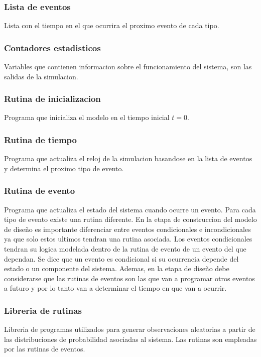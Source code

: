 \documentclass[a4paper]{article}
\begin{document}
\subsubsection*{Lista de eventos}
Lista con el tiempo en el que ocurrira el proximo evento de cada tipo.

\subsubsection*{Contadores estadisticos}
Variables que contienen informacion sobre el funcionamiento del sistema,
son las salidas de la simulacion.

\subsubsection*{Rutina de inicializacion}
Programa que inicializa el modelo en el tiempo inicial $t=0$.

\subsubsection*{Rutina de tiempo}
Programa que actualiza el reloj de la simulacion basandose en la lista de 
eventos y determina el proximo tipo de evento.

\subsubsection*{Rutina de evento}
Programa que actualiza el estado del sistema cuando ocurre un evento. Para cada 
tipo de evento existe una rutina diferente. En la etapa de construccion del 
modelo de diseño es importante diferenciar entre eventos condicionales e 
incondicionales ya que solo estos ultimos tendran una rutina asociada. 
Los eventos condicionales tendran su logica modelada dentro de la rutina de 
evento de un evento del que dependan.
Se dice que un evento es condicional si su ocurrencia depende del estado o un 
componente del sistema.
Ademas, en la etapa de diseño debe considerarse que las rutinas de eventos son las 
que van a programar otros eventos a futuro y por lo tanto van a determinar el tiempo 
en que van a ocurrir.

\subsubsection*{Libreria de rutinas}
Libreria de programas utilizados para generar observaciones aleatorias a partir 
de las distribuciones de probabilidad asociadas al sistema. Las rutinas son 
empleadas por las rutinas de eventos.
\end{document}
